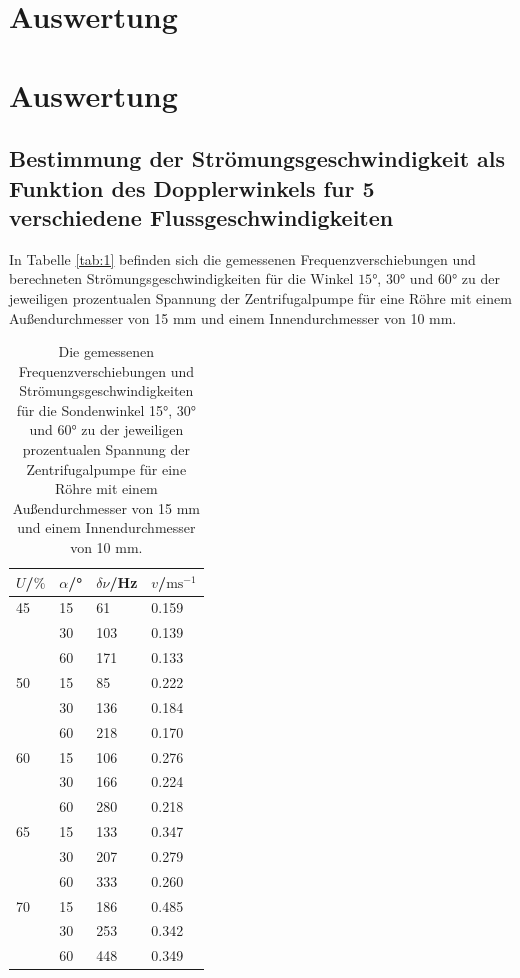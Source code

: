 \section{Auswertung}
\label{sec:Auswertung}


\section{Auswertung}
\subsection{Bestimmung der Strömungsgeschwindigkeit als Funktion des Dopplerwinkels fur 5 verschiedene Flussgeschwindigkeiten}
In Tabelle \autoref{tab:1} befinden sich die gemessenen Frequenzverschiebungen und berechneten Strömungsgeschwindigkeiten für die Winkel $15$°, $30$° und $60$° zu der jeweiligen prozentualen Spannung der Zentrifugalpumpe für eine Röhre mit einem Außendurchmesser von 15 mm und einem Innendurchmesser von 10 mm.
\begin{table}[H]
  \centering
  \caption{Die gemessenen Frequenzverschiebungen und Strömungsgeschwindigkeiten für die Sondenwinkel 15°, 30° und 60° zu der jeweiligen prozentualen Spannung der Zentrifugalpumpe für eine Röhre mit einem Außendurchmesser von 15 mm und einem Innendurchmesser von 10 mm.}
  \begin{tabular}{l|l|l|l}
  $U$/$\%$ & $\alpha$/° & $\delta\nu$/Hz & $v$/$\textrm{ms}^{-1}$\\\hline
  45 & 15 & 61 & 0.159\\
     & 30 & 103 & 0.139\\
     & 60 & 171 & 0.133\\\hline
  50 & 15 & 85 & 0.222\\
     & 30 & 136 & 0.184\\
     & 60 & 218 & 0.170\\\hline
  60 & 15 & 106 & 0.276\\
     & 30 & 166 & 0.224\\
     & 60 & 280 & 0.218\\\hline
  65 & 15 & 133 & 0.347\\
     & 30 & 207 & 0.279\\
     & 60 & 333 & 0.260\\\hline
  70 & 15 & 186 & 0.485\\
     & 30 & 253 & 0.342\\
     & 60 & 448 & 0.349\\\hline
  \end{tabular}
  \label{tab:1}
\end{table}

